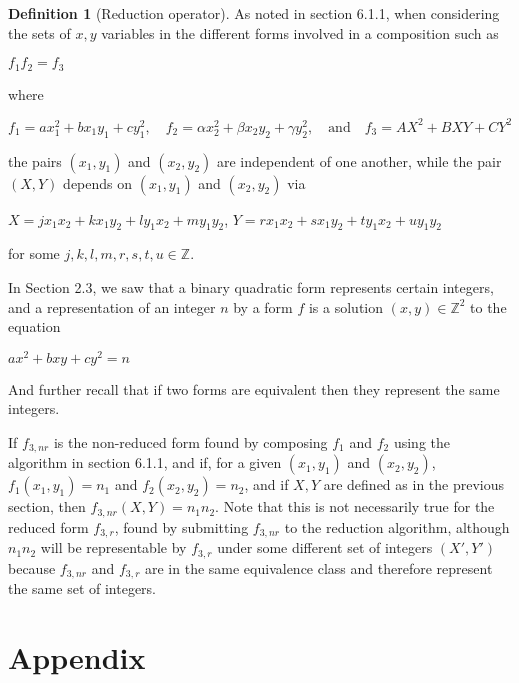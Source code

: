 \documentclass{article}
\theoremstyle{definition}
\newtheorem{definition}{Definition}[section]
\theoremstyle{theorem}
\theoremstyle{example}
\theoremstyle{corollary}
\begin{document}
\begin{definition}[Reduction operator]
As noted in section 6.1.1, when considering the sets of \(x, y\) variables in the different forms involved in a composition such as
\begin{center}
\(f_{1} f_{2} = f_{3}\)
\end{center}
where
\begin{center}
\(f_{1} = a x_{1}^{2} + b x_{1} y_{1} + c y_{1}^{2}, \quad f_{2} = \alpha x_{2}^{2} + \beta x_{2} y_{2} + \gamma y_{2}^{2}, \quad \textrm{and} \quad f_{3} = AX^{2} + BXY + CY^{2}\)
\end{center}
the pairs \((x_{1}, y_{1})\) and \((x_{2}, y_{2})\) are independent of one another, while the pair \((X, Y)\) depends on \((x_{1}, y_{1})\) and \((x_{2}, y_{2})\) via
\begin{center}
\(X = j x_{1} x_{2} + k x_{1} y_{2} + l y_{1} x_{2} + m y_{1} y_{2}\), \quad \(Y = r x_{1} x_{2} + s x_{1} y_{2} + t y_{1} x_{2} + u y_{1} y_{2}\)
\end{center}
for some \(j, k, l, m, r, s, t, u \in \mathbb{Z}\).

\bigskip

In Section 2.3, we saw that a binary quadratic form represents certain integers, and a representation of an integer \(n\) by a form \(f\) is a solution \((x, y) \in \mathbb{Z}^{2}\) to the equation
\begin{center}
\(ax^{2} + bxy + cy^{2} = n\)
\end{center}
And further recall that if two forms are equivalent then they represent the same integers.

\bigskip

If \(f_{3,nr}\) is the non-reduced form found by composing \(f_{1}\) and \(f_{2}\) using the algorithm in section 6.1.1, and if, for a given \((x_{1}, y_{1})\) and \((x_{2}, y_{2})\), \(f_{1} (x_{1}, y_{1}) = n_{1}\) and \(f_{2} (x_{2}, y_{2}) = n_{2}\), and if \(X, Y\) are defined as in the previous section, then \(f_{3,nr} (X, Y) = n_{1} n_{2}\). Note that this is not necessarily true for the reduced form \(f_{3,r}\), found by submitting \(f_{3,nr}\) to the reduction algorithm, although \(n_{1} n_{2}\) will be representable by \(f_{3,r}\) under some different set of integers \((X', Y')\) because \(f_{3,nr}\) and \(f_{3,r}\) are in the same equivalence class and therefore represent the same set of integers.

\bigskip






\newpage

\section{Appendix}


\end{definition}
\end{document}
